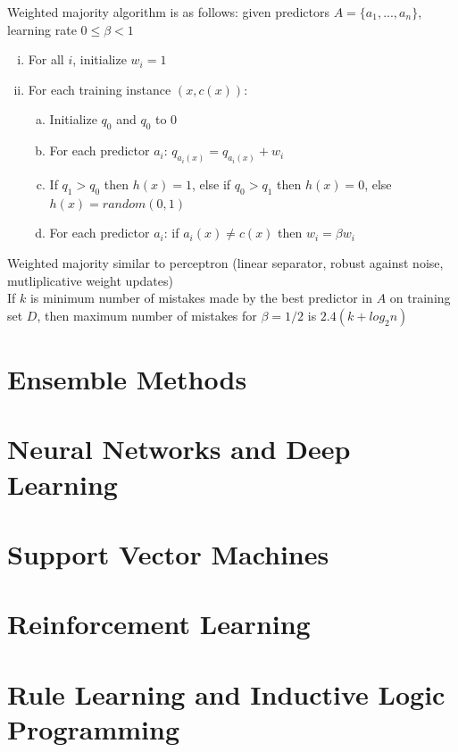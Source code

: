 \documentclass{article}
\begin{document}
			Weighted majority algorithm is as follows: given predictors $A = \{a_1, ..., a_n\}$, learning rate $0 \leq \beta < 1$
			\begin{enumerate}[(i)]
				\item For all $i$, initialize $w_i = 1$
				\item For each training instance $(x, c(x))$:
				\begin{enumerate}[(a)]
					\item Initialize $q_0$ and $q_0$ to 0
					\item For each predictor $a_i$: $q_{a_i(x)} = q_{a_i(x)} + w_i$
					\item If $q_1 > q_0$ then $h(x) = 1$, else if $q_0 > q_1$ then $h(x) = 0$, else $h(x) = random(0, 1)$
					\item For each predictor $a_i$: if $a_i(x) \neq c(x)$ then $w_i = \beta w_i$
					\end{enumerate}
				\end{enumerate}
			Weighted majority similar to perceptron (linear separator, robust against noise, mutliplicative weight updates) \\
			If $k$ is minimum number of mistakes made by the best predictor in $A$ on training set $D$, then maximum number of mistakes for $\beta = 1/2$ is $2.4(k + log_2 n)$
		\clearpage

	\section{Ensemble Methods}
		\clearpage

	\section{Neural Networks and Deep Learning}
		\clearpage

	\section{Support Vector Machines}
		\clearpage

	\section{Reinforcement Learning}
		\clearpage
	
	\section{Rule Learning and Inductive Logic Programming}
		\clearpage	
\end{document}
